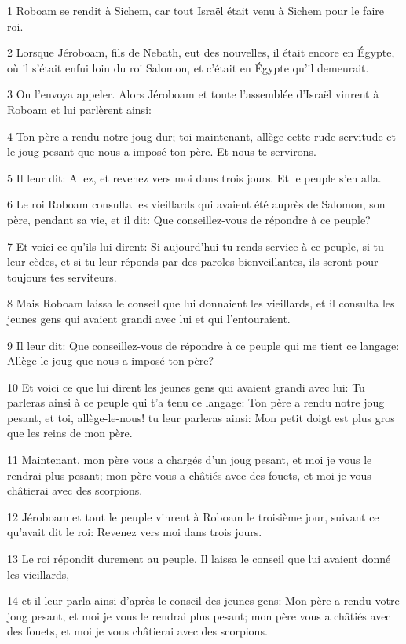 \par 1 Roboam se rendit à Sichem, car tout Israël était venu à Sichem pour le faire roi.
\par 2 Lorsque Jéroboam, fils de Nebath, eut des nouvelles, il était encore en Égypte, où il s'était enfui loin du roi Salomon, et c'était en Égypte qu'il demeurait.
\par 3 On l'envoya appeler. Alors Jéroboam et toute l'assemblée d'Israël vinrent à Roboam et lui parlèrent ainsi:
\par 4 Ton père a rendu notre joug dur; toi maintenant, allège cette rude servitude et le joug pesant que nous a imposé ton père. Et nous te servirons.
\par 5 Il leur dit: Allez, et revenez vers moi dans trois jours. Et le peuple s'en alla.
\par 6 Le roi Roboam consulta les vieillards qui avaient été auprès de Salomon, son père, pendant sa vie, et il dit: Que conseillez-vous de répondre à ce peuple?
\par 7 Et voici ce qu'ils lui dirent: Si aujourd'hui tu rends service à ce peuple, si tu leur cèdes, et si tu leur réponds par des paroles bienveillantes, ils seront pour toujours tes serviteurs.
\par 8 Mais Roboam laissa le conseil que lui donnaient les vieillards, et il consulta les jeunes gens qui avaient grandi avec lui et qui l'entouraient.
\par 9 Il leur dit: Que conseillez-vous de répondre à ce peuple qui me tient ce langage: Allège le joug que nous a imposé ton père?
\par 10 Et voici ce que lui dirent les jeunes gens qui avaient grandi avec lui: Tu parleras ainsi à ce peuple qui t'a tenu ce langage: Ton père a rendu notre joug pesant, et toi, allège-le-nous! tu leur parleras ainsi: Mon petit doigt est plus gros que les reins de mon père.
\par 11 Maintenant, mon père vous a chargés d'un joug pesant, et moi je vous le rendrai plus pesant; mon père vous a châtiés avec des fouets, et moi je vous châtierai avec des scorpions.
\par 12 Jéroboam et tout le peuple vinrent à Roboam le troisième jour, suivant ce qu'avait dit le roi: Revenez vers moi dans trois jours.
\par 13 Le roi répondit durement au peuple. Il laissa le conseil que lui avaient donné les vieillards,
\par 14 et il leur parla ainsi d'après le conseil des jeunes gens: Mon père a rendu votre joug pesant, et moi je vous le rendrai plus pesant; mon père vous a châtiés avec des fouets, et moi je vous châtierai avec des scorpions.
